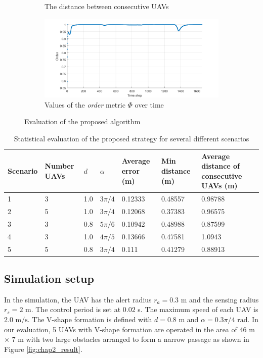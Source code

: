 \begin{figure}[t]
\begin{subfigure}[b]{0.49\textwidth}
    \caption{The distance between consecutive UAVs}
    \label{fig:chap2_mean}
    \end{subfigure}
    \begin{subfigure}[b]{0.49\textwidth}
    \includegraphics[width=\textwidth]{paper1/images/heading.png}
    \caption{Values of the \textit{order} metric $\Phi$ over time}
    \label{fig:chap2_heading}
    \end{subfigure}
    \caption{Evaluation of the proposed algorithm}
    \label{fig:chap2_eval}
\end{figure}

\begin{table}[!]
\centering
\caption{Statistical evaluation of the proposed strategy for several different scenarios}
\label{tbl:chap2_sta}
\begin{tabular}{C{1.2cm}C{1.5cm}C{1cm}C{1cm}C{2cm}C{2cm}C{3.5cm}}
\hline
Scenario & Number UAVs & $d$ & $\alpha$    & Average error (m) & Min distance (m) & Average distance of consecutive UAVs (m) \\      & 3        & 1.0   & $3\pi/4$             & 0.12333   & 0.48557   & 0.98788                      \\
2     & 5        & 1.0   & $3\pi/4$    & 0.12068   & 0.37383   & 0.96575                      \\
3     & 3        & 0.8   & $5\pi/6$    & 0.10942   & 0.48988   & 0.87599                      \\
4     & 3        & 1.0   & $4\pi/5$    & 0.13666   & 0.47581   & 1.0943                       \\
5     & 5        & 0.8   & $3\pi/4$    & 0.111     & 0.41279   & 0.88913     \\ \hline                
\end{tabular}
\end{table}

\subsection{Simulation setup}
In the simulation, the UAV has the alert radius $r_a = 0.3$ m and the sensing radius $r_s = 2$ m. The control period is set at $0.02$ s. The maximum speed of each UAV is $2.0 \text{ m/s}$. The V-shape formation is defined with $d=0.8 \text{ m}$ and $\alpha=0.3\pi/4 \text{ rad}$. In our evaluation, 5 UAVs with V-shape formation are operated in the area of 46 m $\times$ 7 m with two large obstacles arranged to form a narrow passage as shown in Figure \ref{fig:chap2_result}.

